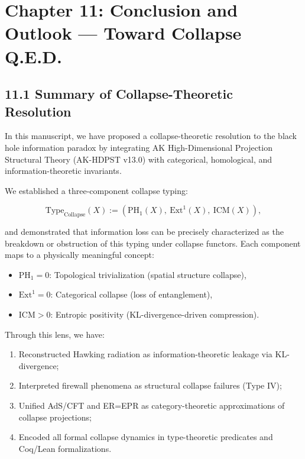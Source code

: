 \documentclass[11pt]{article}
\begin{document}
\section{Chapter 11: Conclusion and Outlook — Toward Collapse Q.E.D.}

\subsection*{11.1 Summary of Collapse-Theoretic Resolution}

In this manuscript, we have proposed a collapse-theoretic resolution to the black hole information paradox by integrating AK High-Dimensional Projection Structural Theory (AK-HDPST v13.0) with categorical, homological, and information-theoretic invariants.

We established a three-component collapse typing:

\[
\mathrm{Type}_{\mathrm{Collapse}}(X) := \left( \mathrm{PH}_1(X),\ \mathrm{Ext}^1(X),\ \mathrm{ICM}(X) \right),
\]

and demonstrated that information loss can be precisely characterized as the breakdown or obstruction of this typing under collapse functors. Each component maps to a physically meaningful concept:

\begin{itemize}
  \item \( \mathrm{PH}_1 = 0 \): Topological trivialization (spatial structure collapse),
  \item \( \mathrm{Ext}^1 = 0 \): Categorical collapse (loss of entanglement),
  \item \( \mathrm{ICM} > 0 \): Entropic positivity (KL-divergence-driven compression).
\end{itemize}

Through this lens, we have:

\begin{enumerate}
  \item Reconstructed Hawking radiation as information-theoretic leakage via KL-divergence;
  \item Interpreted firewall phenomena as structural collapse failures (Type IV);
  \item Unified AdS/CFT and ER=EPR as category-theoretic approximations of collapse projections;
  \item Encoded all formal collapse dynamics in type-theoretic predicates and Coq/Lean formalizations.
\end{enumerate}
\end{document}
